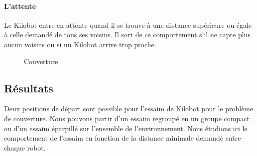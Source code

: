 \documentclass[a4paper]{article}
\begin{document}
\paragraph{L'attente} Le Kilobot entre en attente quand il se trouve à une distance supérieure ou égale à celle demandé de tous ses voisins. Il sort de ce comportement s'il ne capte plus aucun voisins ou si un Kilobot arrive trop proche.\\


\begin{figure}[h!]
\centering
{}
\caption{Couverture}
\end{figure}
\newpage
\subsection{Résultats}
Deux positions de départ sont possible pour l'essaim de Kilobot pour le problème de couverture. Nous pouvons partir d'un essaim regroupé en un groupe compact ou d'un essaim éparpillé sur l'ensemble de l'environnement.
Nous étudions ici le comportement de l'essaim en fonction de la distance minimale demandé entre chaque robot.
\end{document}
